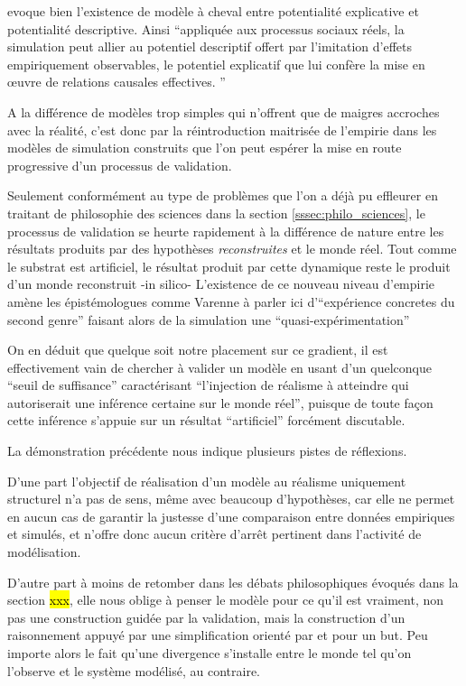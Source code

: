 \textcite{Bulle2005} evoque bien l'existence de modèle à cheval entre potentialité explicative et potentialité descriptive. Ainsi \enquote{appliquée aux processus sociaux réels, la simulation peut allier au potentiel descriptif offert par l’imitation d’effets empiriquement observables, le potentiel explicatif que lui confère la mise en œuvre de relations causales effectives. }

A la différence de modèles trop simples qui n'offrent que de maigres accroches avec la réalité, c'est donc par la réintroduction maitrisée de l'empirie dans les modèles de simulation construits que l'on peut espérer la mise en route progressive d'un processus de validation.

Seulement conformément au type de problèmes que l'on a déjà pu effleurer en traitant de philosophie des sciences dans la section \ref{sssec:philo_sciences}, le processus de validation se heurte rapidement à la différence de nature entre les résultats produits par des hypothèses \textit{reconstruites} et le monde réel. Tout comme le substrat est artificiel, le résultat produit par cette dynamique reste le produit d'un monde reconstruit -in silico- L'existence de ce nouveau niveau d'empirie amène les épistémologues comme Varenne à parler ici d'\enquote{expérience concretes du second genre} faisant alors de la simulation une \enquote{quasi-expérimentation} \autocites{Varenne2001, Varenne2007, Phan2008}

On en déduit que quelque soit notre placement sur ce gradient, il est effectivement vain de chercher à valider un modèle en usant d'un quelconque \enquote{seuil de suffisance} caractérisant \enquote{l'injection de réalisme à atteindre qui autoriserait une inférence certaine sur le monde réel}, puisque de toute façon cette inférence s'appuie sur un résultat \enquote{artificiel} forcément discutable.   

La démonstration précédente nous indique plusieurs pistes de réflexions.

D'une part l'objectif de réalisation d'un modèle au réalisme uniquement structurel n'a pas de sens, même avec beaucoup d'hypothèses, car elle ne permet en aucun cas de garantir la justesse d'une comparaison entre données empiriques et simulés, et n'offre donc aucun critère d'arrêt pertinent dans l'activité de modélisation.

D'autre part à moins de retomber dans les débats philosophiques évoqués dans la section \hl{xxx}, elle nous oblige à penser le modèle pour ce qu'il est vraiment, non pas une construction guidée par la validation, mais la construction d'un raisonnement appuyé par une simplification orienté par et pour un but. Peu importe alors le fait qu'une divergence s'installe entre le monde tel qu'on l'observe et le système modélisé, au contraire.

